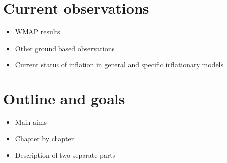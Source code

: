 \section{Current observations}
\label{sec:obs-intro}
\begin{itemize}
 \item WMAP results
 \item Other ground based observations
 \item Current status of inflation in general and specific inflationary models
\end{itemize}


\section{Outline and goals}
\label{sec:goals-intro}
\begin{itemize}
 \item Main aims
 \item Chapter by chapter
 \item Description of two separate parts
\end{itemize}


